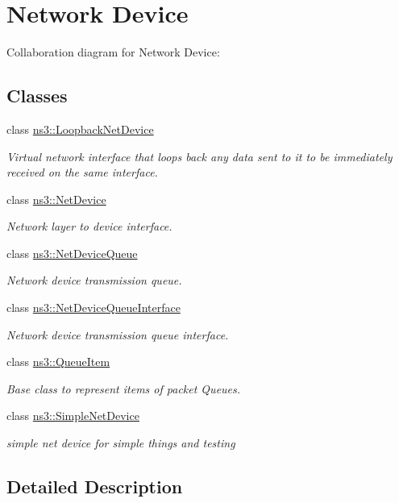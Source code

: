 \hypertarget{group__netdevice}{}\section{Network Device}
\label{group__netdevice}
Collaboration diagram for Network Device\+:
\subsection*{Classes}
\begin{DoxyCompactItemize}
\item 
class \hyperlink{classns3_1_1LoopbackNetDevice}{ns3\+::\+Loopback\+Net\+Device}
\begin{DoxyCompactList}\small\item\em Virtual network interface that loops back any data sent to it to be immediately received on the same interface. \end{DoxyCompactList}\item 
class \hyperlink{classns3_1_1NetDevice}{ns3\+::\+Net\+Device}
\begin{DoxyCompactList}\small\item\em Network layer to device interface. \end{DoxyCompactList}\item 
class \hyperlink{classns3_1_1NetDeviceQueue}{ns3\+::\+Net\+Device\+Queue}
\begin{DoxyCompactList}\small\item\em Network device transmission queue. \end{DoxyCompactList}\item 
class \hyperlink{classns3_1_1NetDeviceQueueInterface}{ns3\+::\+Net\+Device\+Queue\+Interface}
\begin{DoxyCompactList}\small\item\em Network device transmission queue interface. \end{DoxyCompactList}\item 
class \hyperlink{classns3_1_1QueueItem}{ns3\+::\+Queue\+Item}
\begin{DoxyCompactList}\small\item\em Base class to represent items of packet Queues. \end{DoxyCompactList}\item 
class \hyperlink{classns3_1_1SimpleNetDevice}{ns3\+::\+Simple\+Net\+Device}
\begin{DoxyCompactList}\small\item\em simple net device for simple things and testing \end{DoxyCompactList}\end{DoxyCompactItemize}


\subsection{Detailed Description}
